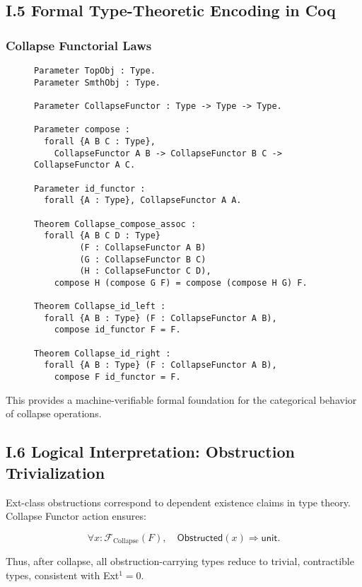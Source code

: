 \documentclass[11pt]{article}
\begin{document}
\subsection*{I.5 Formal Type-Theoretic Encoding in Coq}

\subsubsection*{Collapse Functorial Laws}

\begin{figure}[h]
\centering
\begin{lstlisting}[language=Coq, mathescape=false]
Parameter TopObj : Type.
Parameter SmthObj : Type.

Parameter CollapseFunctor : Type -> Type -> Type.

Parameter compose :
  forall {A B C : Type},
    CollapseFunctor A B -> CollapseFunctor B C -> CollapseFunctor A C.

Parameter id_functor :
  forall {A : Type}, CollapseFunctor A A.

Theorem Collapse_compose_assoc :
  forall {A B C D : Type}
         (F : CollapseFunctor A B)
         (G : CollapseFunctor B C)
         (H : CollapseFunctor C D),
    compose H (compose G F) = compose (compose H G) F.

Theorem Collapse_id_left :
  forall {A B : Type} (F : CollapseFunctor A B),
    compose id_functor F = F.

Theorem Collapse_id_right :
  forall {A B : Type} (F : CollapseFunctor A B),
    compose F id_functor = F.
\end{lstlisting}
\end{figure}

This provides a machine-verifiable formal foundation for the categorical behavior of collapse operations.

\subsection*{I.6 Logical Interpretation: Obstruction Trivialization}

Ext-class obstructions correspond to dependent existence claims in type theory. Collapse Functor action ensures:

\[
\forall x : \mathcal{F}_{\mathrm{Collapse}}(F), \quad \mathsf{Obstructed}(x) \Rightarrow \mathsf{unit}.
\]

Thus, after collapse, all obstruction-carrying types reduce to trivial, contractible types, consistent with Ext$^1 = 0$.
\end{document}
